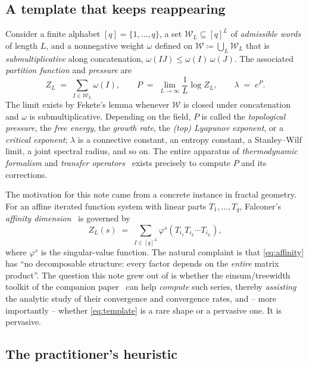 \documentclass[11pt]{article}
\newcommand{\calW}{\mathcal{W}}
\newcommand{\eqdef}{\coloneqq}
\newcommand{\pressure}{P}
\theoremstyle{plain}
\theoremstyle{definition}
\theoremstyle{remark}
\begin{document}
\subsection{A template that keeps reappearing}

Consider a finite alphabet $[q]=\{1,\dots,q\}$, a set
$\calW_L\subseteq[q]^L$ of \emph{admissible words} of length $L$, and a
nonnegative weight $\omega$ defined on $\calW\eqdef\bigcup_L\calW_L$ that is
\emph{submultiplicative} along concatenation, $\omega(IJ)\le\omega(I)\,\omega(J)$.
The associated \emph{partition function} and \emph{pressure} are
\begin{equation}
\label{eq:template}
   Z_L \;=\; \sum_{I\in\calW_L}\omega(I),
   \qquad
   \pressure \;=\; \lim_{L\to\infty}\frac1L\log Z_L,
   \qquad
   \lambda\;=\;e^{\pressure}.
\end{equation}
The limit exists by Fekete's lemma whenever $\calW$ is closed under concatenation
and $\omega$ is submultiplicative. Depending on the field, $\pressure$ is called the
\emph{topological pressure}, the \emph{free energy}, the \emph{growth rate}, the
\emph{(top) Lyapunov exponent}, or a \emph{critical exponent}; $\lambda$ is a
connective constant, an entropy constant, a Stanley--Wilf limit, a joint spectral
radius, and so on. The entire apparatus of \emph{thermodynamic formalism} and
\emph{transfer operators}~\citep{ruelle2004thermodynamic,parry1990zeta,baladi2000positive}
exists precisely to compute $\pressure$ and its corrections.

The motivation for this note came from a concrete instance in fractal geometry.
For an affine iterated function system with linear parts $T_1,\dots,T_q$, Falconer's
\emph{affinity dimension}~\citep{falconer1988hausdorff} is governed by
\begin{equation}
\label{eq:affinity}
   Z_L(s) \;=\; \sum_{I\in[q]^L}\varphi^s(T_{i_1}T_{i_2}\cdots T_{i_L}),
\end{equation}
where $\varphi^s$ is the singular-value function. The natural complaint is that
\eqref{eq:affinity} has ``no decomposable structure: every factor depends on the
\emph{entire} matrix product''. The question this note grew out of is whether the
einsum/treewidth toolkit of the companion paper~\citep{chen2024ustats} can help
\emph{compute} such series, thereby \emph{assisting} the analytic study of their
convergence and convergence rates, and -- more importantly -- whether
\eqref{eq:template} is a rare shape or a pervasive one. It is pervasive.

\subsection{The practitioner's heuristic}
\end{document}
